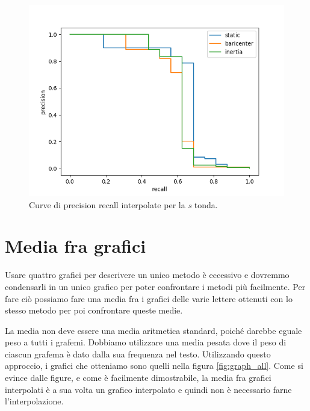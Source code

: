 \begin{figure}
    \centering
    \includegraphics[width=.9\textwidth]{figures/graphs/S_tondaFalseinterpolated.png}
    \caption{Curve di precision recall interpolate per la \emph{s} tonda.}
    \label{fig:graph_S_tonda_interpolated}
\end{figure}

\section{Media fra grafici}

Usare quattro grafici per descrivere un unico metodo \`e eccessivo e dovremmo condensarli in un unico grafico per poter confrontare i metodi pi\`u facilmente. Per fare ci\`o possiamo fare una media fra i grafici delle varie lettere ottenuti con lo stesso metodo per poi confrontare queste medie.

La media non deve essere una media aritmetica standard, poich\'e darebbe eguale peso a tutti i grafemi. Dobbiamo utilizzare una media pesata dove il peso di ciascun grafema \`e dato dalla sua frequenza nel testo. Utilizzando questo approccio, i grafici che otteniamo sono quelli nella figura \ref{fig:graph_all}. Come si evince dalle figure, e come \`e facilmente dimostrabile, la media fra grafici interpolati \`e a sua volta un grafico interpolato e quindi non \`e necessario farne l'interpolazione.

